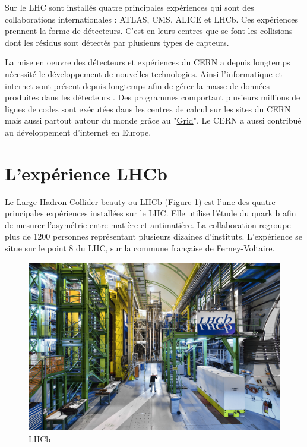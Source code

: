 \documentclass[a4paper,11pt]{report}
\begin{document}
Sur le LHC sont installés quatre principales expériences qui sont des collaborations internationales : ATLAS, CMS, ALICE et LHCb.
Ces expériences prennent la forme de détecteurs. C'est en leurs centres que se font les collisions dont les résidus sont détectés par plusieurs types de capteurs.

La mise en oeuvre des détecteurs et expériences du CERN a depuis longtemps nécessité le développement de nouvelles technologies.
Ainsi l'informatique et internet sont présent depuis longtemps afin de gérer la masse de données produites dans les détecteurs \cite{Saikumar:2022mgb}.
Des programmes comportant plusieurs millions de lignes de codes sont exécutées dans les centres de calcul sur les sites du CERN mais aussi partout autour du monde grâce au "\href{https://wlcg-public.web.cern.ch/}{Grid}".
Le CERN a aussi contribué au développement d'internet en Europe.

\section{L'expérience LHCb}
Le Large Hadron Collider beauty ou \href{https://lhcb.web.cern.ch/}{LHCb} (Figure \ref{LHCb}) est l'une des quatre principales expériences installées sur le LHC.
Elle utilise l'étude du quark b afin de mesurer l'asymétrie entre matière et antimatière.
La collaboration regroupe plus de 1200 personnes représentant plusieurs dizaines d'instituts.
L'expérience se situe sur le point 8 du LHC, sur la commune française de Ferney-Voltaire.

\begin{figure}[!htb]
    \includegraphics[width=\textwidth, center]{LHCb.jpg}
    \caption{LHCb}
    \label{LHCb}
\end{figure}
\end{document}

